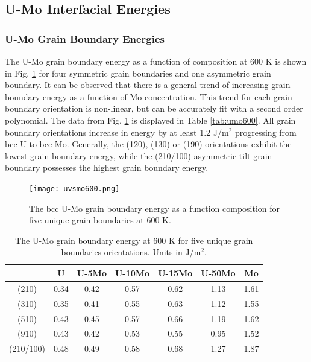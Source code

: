 \documentclass[review]{elsarticle}
\begin{document}
\FloatBarrier

\subsection{U-Mo Interfacial Energies}
\subsubsection{U-Mo Grain Boundary Energies}

The U-Mo grain boundary energy as a function of composition at 600 K is shown in Fig. \ref{fig:umo600} for four symmetric grain boundaries and one asymmetric grain boundary. It can be observed that there is a general trend of increasing grain boundary energy as a function of Mo concentration. This trend for each grain boundary orientation is non-linear, but can be accurately fit with a second order polynomial. The data from Fig.  \ref{fig:umo600} is displayed in Table \ref{tab:umo600}. All grain boundary orientations increase in energy by at least 1.2 J/m$^{2}$ progressing from bcc U to bcc Mo. Generally, the (120), (130) or (190) orientations exhibit the lowest grain boundary energy, while the (210/100) asymmetric tilt grain boundary possesses the highest grain boundary energy. 

\begin{figure}[h]
 \centering
 \texttt{[image: uvsmo600.png]} 
 \caption{The bcc U-Mo grain boundary energy as a function composition for five unique grain boundaries at 600 K.}
 \label{fig:umo600}
\end{figure}

\FloatBarrier

\begin{table}[h]
\caption{The U-Mo grain boundary energy at 600 K for five unique grain boundaries orientations. Units in J/m$^{2}$. } \label{tab:umo600}
\begin{center}
\begin{tabular}{|c|c|c|c|c|c|c|}
	\hline
 & U & U-5Mo & U-10Mo & U-15Mo & U-50Mo & Mo \\
\hline
(210) & 0.34 & 0.42 & 0.57 & 0.62 & 1.13 & 1.61 \\
(310) & 0.35 & 0.41 & 0.55 & 0.63 & 1.12 & 1.55 \\ 
(510) & 0.43 & 0.45 & 0.57 & 0.66 & 1.19 & 1.62 \\ 
(910)	 & 0.43 & 0.42 & 0.53 & 0.55 & 0.95 & 1.52 \\ 
(210/100) & 0.48 & 0.49 & 0.58 & 0.68 & 1.27 & 1.87 \\
 	 \hline
\end{tabular}
\end{center}
\label{default}
\end{table}
\end{document}
